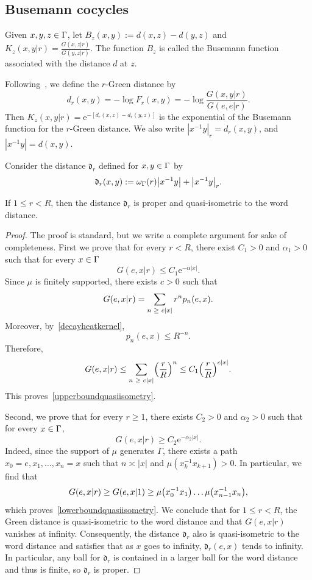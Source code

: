 \documentclass[AHL,Unicode,longabstracts]{cedram}
\newcommand{\rme}{\mathrm{e}}
\newcommand{\fkd}{\mathfrak{d}}
\let\originalleft\left
\let\originalright\right
\renewcommand{\left}{\mathopen{}\mathclose\bgroup\originalleft}
\renewcommand{\right}{\aftergroup\egroup\originalright}
\let\oldin\in
\renewcommand{\in}{\mathchoice{\oldin}{\oldin}{\,\oldin\,}{\,\oldin\,}}
\let\oldge\ge
\renewcommand{\ge}{\mathchoice{\oldge}{\oldge}{\,\oldge\,}{\,\oldge\,}}
\begin{document}
\subsection{Busemann cocycles}
Given $x,y,z \in \Gamma$, let $B_z(x, y) := d(x, z) -d(y,z)$ and $K_z(x,y|r)=\frac{G(x,z|r)}{G(y,z|r)}$. The function $B_z$ is called the Busemann function associated with the distance $d$ at $z$.

Following~\cite{BlachereBrofferio}, we define the $r$-Green distance by
\[
d_r(x,y) = - \log F_r(x,y)=-\log \frac{ G(x,y|r)}{G(e,e|r)}.
\]
Then $K_z(x,y|r)=\rme^{-[d_r(x,z)-d_r(y,z)]}$ is the exponential of the Busemann function for the $r$-Green distance. We also write $|x^{-1}y|_r=d_r(x,y)$, and $|x^{-1}y|=d(x,y)$.

Consider the distance $\fkd_r$ defined for $x,y\in \Gamma$ by
\[
\fkd_r(x,y):=\omega_\Gamma(r)\left|x^{-1}y\right| +\left|x^{-1}y\right|_r.
\]

\begin{lemm}\label{quasiisometricdistances}
If $1\leq r<R$, then the distance $\fkd_r$ is proper and quasi-isometric to the word distance.
\end{lemm}

\begin{proof}
The proof is standard, but we write a complete argument for sake of completeness. First we prove that for every $r<R$, there exist $C_1> 0$ and $\alpha_1>0$ such that for every $x\in \Gamma$
\begin{equation}\label{upperboundquasiisometry}
G(e,x|r)\leq C_1\rme^{-\alpha |x|}.
\end{equation}
Since $\mu$ is finitely supported, there exists $c> 0$ such that
\[
G(e,x|r)=\sum_{n\ge c|x|}r^np_n(e,x).
\]
Moreover, by~\eqref{decayheatkernel},
\[
p_n(e,x)\leq R^{-n}.
\]
Therefore,
\[
G(e,x|r)\leq \sum_{n\ge c|x|}\left (\frac{r}{R}\right)^n\leq C_1\left (\frac{r}{R}\right)^{c|x|}.
\]
This proves~\eqref{upperboundquasiisometry}.

Second, we prove that for every $r\geq 1$, there exists $C_2>0$ and $\alpha_2>0$ such that for every $x\in \Gamma$,
\begin{equation}\label{lowerboundquasiisometry}
G(e,x|r)\geq C_2 \rme^{-\alpha_2 |x|}.
\end{equation}
Indeed, since the support of $\mu$ generates $\Gamma$, there exists a path $x_0=e,x_1,\dots,x_n=x$ such that $n\asymp |x|$ and $\mu(x_k^{-1}x_{k+1})>0$. In particular, we find that
\[
G(e,x|r)\geq G(e,x|1)\geq \mu\left(x_0^{-1}x_1\right)\dots \mu\left(x_{n-1}^{-1}x_n\right),
\]
which proves~\eqref{lowerboundquasiisometry}. We conclude that for $1\leq r<R$, the Green distance is quasi-isometric to the word distance and that $G(e,x|r)$ vanishes at infinity. Consequently, the distance $\fkd_r$ also is quasi-isometric to the word distance and satisfies that as $x$ goes to infinity, $\fkd_r(e,x)$ tends to infinity. In particular, any ball for $\fkd_r$ is contained in a larger ball for the word distance and thus is finite, so $\fkd_r$ is proper.
\end{proof}
\end{document}
